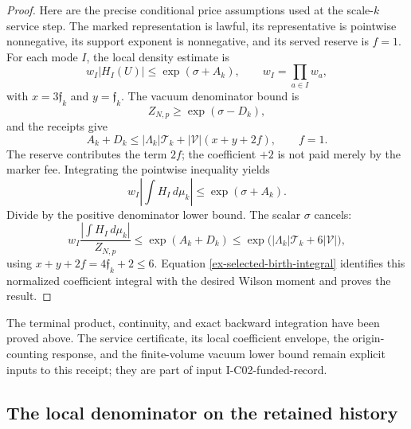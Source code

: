 \begin{proof}
Here are the precise conditional price assumptions used at the scale-$k$ service step. The marked representation is lawful, its representative is pointwise nonnegative, its support exponent is nonnegative, and its served reserve is $f=1$. For each mode $I$, the local density estimate is
\[
 w_I|H_I(U)|\leq \exp(\sigma+A_k),
 \qquad w_I=\prod_{a\in I}w_a,
\]
with $x=3\mathfrak f_k$ and $y=\mathfrak f_k$. The vacuum denominator bound is
\[
 Z_{N,p}\geq\exp(\sigma-D_k),
\]
and the receipts give
\[
 A_k+D_k\leq |\Lambda_k|\mathcal T_k
            +|\mathcal V|(x+y+2f),\qquad f=1.
\]
The reserve contributes the term $2f$; the coefficient $+2$ is not paid merely by the marker fee. Integrating the pointwise inequality yields
\[
 w_I\left|\int H_I\,d\mu_k\right|
 \leq \exp(\sigma+A_k).
\]
Divide by the positive denominator lower bound. The scalar $\sigma$ cancels:
\[
 w_I\frac{|\int H_I\,d\mu_k|}{Z_{N,p}}
 \leq \exp(A_k+D_k)
 \leq \exp\bigl(|\Lambda_k|\mathcal T_k+6|\mathcal V|\bigr),
\]
using $x+y+2f=4\mathfrak f_k+2\leq6$. Equation \eqref{ex-selected-birth-integral} identifies this normalized coefficient integral with the desired Wilson moment and proves the result.
\end{proof}

The terminal product, continuity, and exact backward integration have been proved above. The service certificate, its local coefficient envelope, the origin-counting response, and the finite-volume vacuum lower bound remain explicit inputs to this receipt; they are part of input I-C02-funded-record.

\subsection{The local denominator on the retained history}

